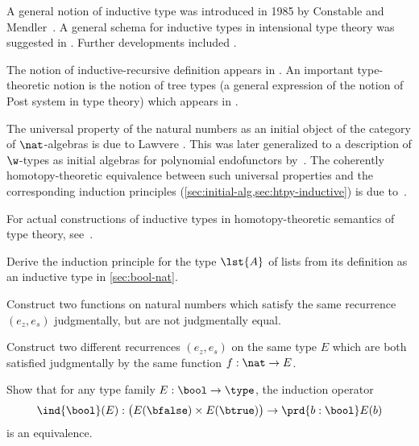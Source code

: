 A general notion of inductive type was introduced in 1985 by Constable and Mendler~\cite{DBLP:conf/lop/ConstableM85}.  A general schema for inductive types in intensional type theory was suggested in
\cite{PfenningPaulinMohring}.  Further developments included \cite{CoquandPaulin, Dybjer:1991}.

The notion of inductive-recursive definition appears in \cite{Dybjer:2000}. An important  type-theoretic notion is the notion of tree types (a general expression of the notion of Post system in type theory) which appears in \cite{PeterssonSynek}.

The universal property of the natural numbers as an initial object of the category of $\nat$-algebras is due to Lawvere \cite{lawvere:adjinfound}.
This was later generalized to a description of $\w$-types as initial algebras for polynomial endofunctors by~\cite{mp:wftrees}.
The coherently homotopy-theoretic equivalence between such universal properties and the corresponding induction principles (\cref{sec:initial-alg,sec:htpy-inductive}) is due to~\cite{ags:it-hott}.

For actual constructions of inductive types in homotopy-theoretic semantics of type theory, see~\cite{klv:ssetmodel,mvdb:wtypes,ls:hits}.

\sectionExercises

\begin{ex}\label{ex:ind-lst}
  Derive the induction principle for the type $\lst{A}$ of lists from its definition as an inductive type in \cref{sec:bool-nat}.
\end{ex}

\begin{ex}\label{ex:same-recurrence-not-defeq}
  Construct two functions on natural numbers which satisfy the same recurrence $(e_z, e_s)$ judgmentally, but are not judgmentally equal.
\end{ex}

\begin{ex}\label{ex:one-function-two-recurrences}
  Construct two different recurrences $(e_z,e_s)$ on the same type $E$ which are both satisfied judgmentally by the same function $f:\nat\to E$.
\end{ex}

\begin{ex}\label{ex:bool}
  Show that for any type family $E : \bool \to \type$, the induction operator
  \[ \ind{\bool}(E) : \big(E(\bfalse) \times E(\btrue)\big) \to \prd{b : \bool} E(b) \]
  is an equivalence.
\end{ex}

